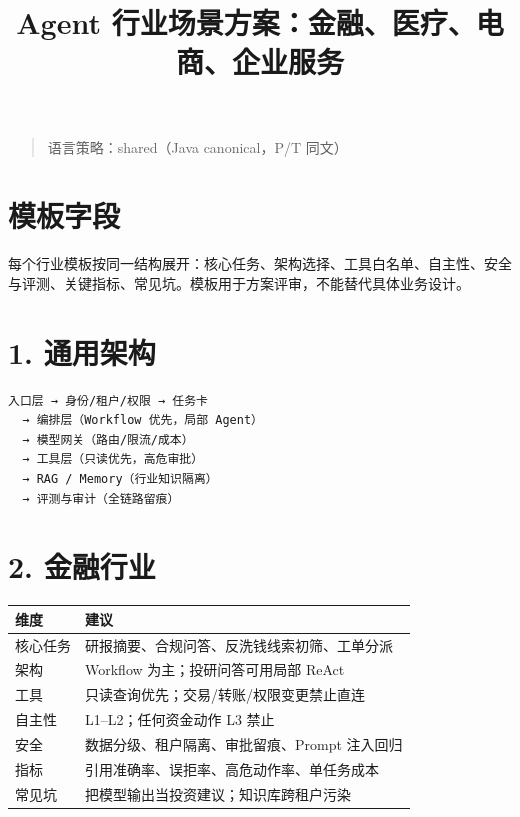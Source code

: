 \documentclass[9pt,a4paper,twocolumn]{ctexart}
\begin{document}
\title{Agent 行业场景方案：金融、医疗、电商、企业服务}
\date{}
\maketitle
{}

\begin{quote}
语言策略：shared（Java canonical，P/T 同文）
\end{quote}



\section*{模板字段}


每个行业模板按同一结构展开：核心任务、架构选择、工具白名单、自主性、安全与评测、关键指标、常见坑。模板用于方案评审，不能替代具体业务设计。



\section*{1. 通用架构}


\begin{lstlisting}
入口层 → 身份/租户/权限 → 任务卡
  → 编排层（Workflow 优先，局部 Agent）
  → 模型网关（路由/限流/成本）
  → 工具层（只读优先，高危审批）
  → RAG / Memory（行业知识隔离）
  → 评测与审计（全链路留痕）
\end{lstlisting}



\section*{2. 金融行业}

{\footnotesize
\begin{tabular}{|p{}|p{}|}
\hline
\textbf{维度} & \textbf{建议} \\
\hline
核心任务 & 研报摘要、合规问答、反洗钱线索初筛、工单分派 \\
\hline
架构 & Workflow 为主；投研问答可用局部 ReAct \\
\hline
工具 & 只读查询优先；交易/转账/权限变更禁止直连 \\
\hline
自主性 & L1–L2；任何资金动作 L3 禁止 \\
\hline
安全 & 数据分级、租户隔离、审批留痕、Prompt 注入回归 \\
\hline
指标 & 引用准确率、误拒率、高危动作率、单任务成本 \\
\hline
常见坑 & 把模型输出当投资建议；知识库跨租户污染 \\
\hline
\end{tabular}
}
\end{document}
